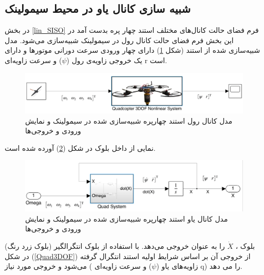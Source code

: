 \subsection{شبیه سازی کانال یاو در محیط سیمولینک}
در بخش
\ref{lin_SISO}
فرم فضای حالت کانال‌های مختلف استند چهار پره بدست آمد در این بخش فرم فضای حالت کانال رول در سیمولینک شبیه‌سازی می‌شود.
مدل شبیه‌سازی شده از استند (شکل \ref{yaw_simulink}) دارای چهار ورودی سرعت دورانی موتورها  و دارای یک خروجی زاویه‌ی رول ($\psi$) و  سرعت زاویه‌ای r است.
\begin{figure}[H]
	\includegraphics[width=16cm]{../../Figures/QuadSimulation/yaw_Stand_Model.png}
	\centering
	\vspace*{-15mm}
	\caption{مدل کانال رول استند چهارپره شبیه‌سازی شده در سیمولینک و نمایش ورودی و خروجی‌ها}
	\label{yaw_simulink}
\end{figure}

نمایی از داخل بلوک
در شکل (\ref{Quad1DOF_yaw}) آورده شده است.
\begin{figure}[H]
	\includegraphics[width=16cm]{../../Figures/QuadSimulation/yaw_Integrator.png}
	\centering
	\vspace*{-15mm}
	\caption{مدل کانال یاو استند چهارپره شبیه‌سازی شده در سیمولینک و نمایش ورودی و خروجی‌ها}
	\label{Quad1DOF_yaw}
\end{figure}
بلوک
،
$\dot X$ را به عنوان خروجی می‌دهد. با استفاده از بلوک انتگرالگیر (بلوک زرد رنگ) در شکل
(\ref{Quad3DOF})
از خروجی آن بر اساس شرایط اولیه استند انتگرال گرفته می‌شود و خروجی مورد نیاز ( زاویه‌های یاو ($\psi$) و سرعت زاویه‌ای‌
q)
را می دهد.

